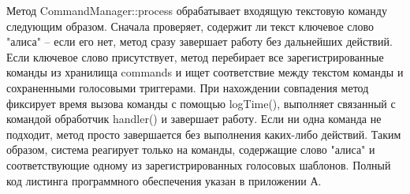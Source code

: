 Метод CommandManager::process обрабатывает входящую текстовую команду следующим образом. Сначала проверяет, содержит ли текст ключевое слово "алиса" -- если его нет, метод сразу завершает работу без дальнейших действий. Если ключевое слово присутствует, метод перебирает все зарегистрированные команды из хранилища commands и ищет соответствие между текстом команды и сохраненными голосовыми триггерами. При нахождении совпадения метод фиксирует время вызова команды с помощью logTime(), выполняет связанный с командой обработчик handler() и завершает работу. Если ни одна команда не подходит, метод просто завершается без выполнения каких-либо действий. Таким образом, система реагирует только на команды, содержащие слово "алиса" и соответствующие одному из зарегистрированных голосовых шаблонов. Полный код листинга программного обеспечения указан в приложении А.

\newpage
